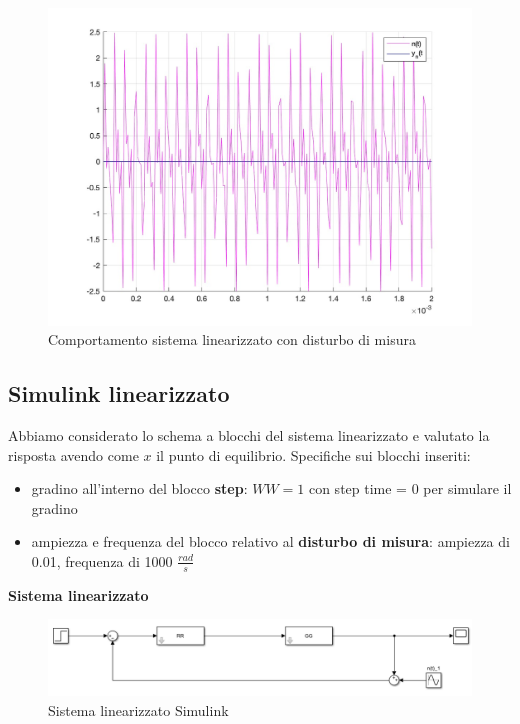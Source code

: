 \documentclass[a4paper, 11pt]{article}
\begin{document}
\begin{figure} [!h]
    \centering
    \includegraphics[scale = 0.25]{Immagini/Disturbo_misura.jpg}
    \caption{Comportamento sistema linearizzato con disturbo di misura}
    \label{fig:enter-label}
\end{figure}

\subsection{Simulink linearizzato}

Abbiamo considerato lo schema a blocchi del sistema linearizzato e valutato la risposta avendo come $x$ il punto di equilibrio. Specifiche sui blocchi inseriti:
\begin{itemize}
    \item gradino all'interno del blocco \textbf{step}: $WW = 1$ con step time = 0 per simulare il gradino
    \item ampiezza e frequenza del blocco relativo al \textbf{disturbo di misura}: ampiezza di 0.01, frequenza di 1000 $\frac{rad}{s}$
\end{itemize}

\vspace{0.2cm}

\textbf{Sistema linearizzato}
\begin{figure} [!h]
    \centering
    \includegraphics[scale = 0.6]{Simulink/Sim_lin_disturbi.png}
    \caption{Sistema linearizzato Simulink}
    \label{fig:enter-label}
\end{figure}
\end{document}
